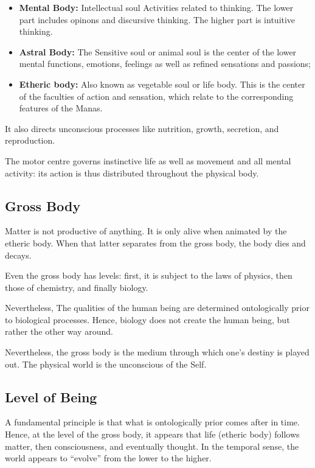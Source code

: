 \begin{itemize}
\item\textbf{Mental Body:}
Intellectual soul Activities related to thinking. The lower part includes opinons and discursive thinking. The higher part is intuitive thinking.

\item\textbf{Astral Body:}
The Sensitive soul or animal soul is the center of the lower mental functions, emotions, feelings as well as refined sensations and passions;

\item\textbf{Etheric body:}
Also known as vegetable soul or life body. This is the center of the faculties of action and sensation, which relate to the corresponding features of the Manas.
\end{itemize}

It also directs unconscious processes like nutrition, growth, secretion, and reproduction.

The motor centre governs instinctive life as well as movement and all mental activity: its action is thus distributed throughout the physical body.

\subsection*{Gross Body}
Matter is not productive of anything. It is only alive when animated by the etheric body. When that latter separates from the gross body, the body dies and decays.

Even the gross body has levels: first, it is subject to the laws of physics, then those of chemistry, and finally biology.

Nevertheless, The qualities of the human being are determined ontologically prior to biological processes. Hence, biology does not create the human being, but rather the other way around.

Nevertheless, the gross body is the medium through which one's destiny is played out. The physical world is the unconscious of the Self.

\subsection*{Level of Being}
A fundamental principle is that what is ontologically prior comes after in time. Hence, at the level of the gross body, it appears that life (etheric body) follows matter, then consciousness, and eventually thought. In the temporal sense, the world appears to “evolve” from the lower to the higher.

